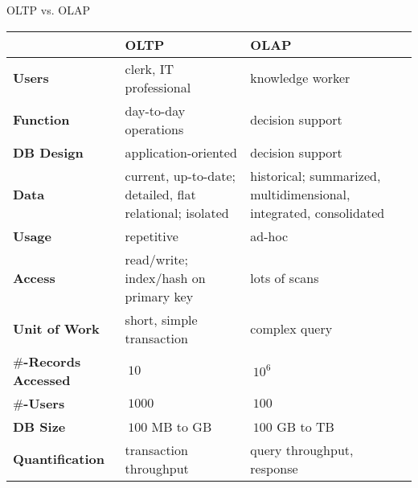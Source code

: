 \begin{frame}{OLTP vs. OLAP}
	\begin{tabularx}{\textwidth}{|b|X|X|}
		\rowcolor{faugray!62}          & \textbf{OLTP}                                            & \textbf{OLAP}                                                      \\\hline
		\textbf{Users}                 & clerk, IT professional                                   & knowledge worker                                                   \\ \hline
		\textbf{Function}              & day-to-day operations                                    & decision support                                                   \\ \hline
		\textbf{DB Design}             & application-oriented                                     & decision support                                                   \\ \hline
		\textbf{Data}                  & current, up-to-date; detailed, flat relational; isolated & historical; summarized, multidimensional, integrated, consolidated \\ \hline
		\textbf{Usage}                 & repetitive                                               & ad-hoc                                                             \\ \hline
		\textbf{Access}                & read/write; index/hash on primary key                    & lots of scans                                                      \\ \hline
		\textbf{Unit of Work}          & short, simple transaction                                & complex query                                                      \\ \hline
		\textbf{$\#$-Records Accessed} & $~ 10$                                                   & $~ 10^6$                                                           \\ \hline
		\textbf{$\#$-Users}            & $~ 1000$                                                 & $~ 100$                                                            \\ \hline
		\textbf{DB Size}               & $~ 100$ MB to GB                                         & $~ 100$ GB to TB                                                   \\ \hline
		\textbf{Quantification}        & transaction throughput                                   & query throughput, response                                         \\ \hline
	\end{tabularx}
\end{frame}

